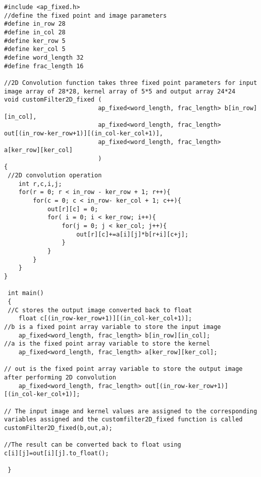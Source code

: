 
\lstset{framesep=-10pt, xleftmargin=-10pt}
\begin{lstlisting}[caption={2D Convolution for Fixed Point Variables},label={listing:5.6}]
#include <ap_fixed.h>
//define the fixed point and image parameters
#define in_row 28
#define in_col 28
#define ker_row 5
#define ker_col 5
#define word_length 32
#define frac_length 16

//2D Convolution function takes three fixed point parameters for input image array of 28*28, kernel array of 5*5 and output array 24*24
void customFilter2D_fixed (
                          ap_fixed<word_length, frac_length> b[in_row][in_col],
                          ap_fixed<word_length, frac_length> out[(in_row-ker_row+1)][(in_col-ker_col+1)],
                          ap_fixed<word_length, frac_length> a[ker_row][ker_col]
                          )
{
 //2D convolution operation
	int r,c,i,j;
	for(r = 0; r < in_row - ker_row + 1; r++){
        for(c = 0; c < in_row- ker_col + 1; c++){
            out[r][c] = 0;
            for( i = 0; i < ker_row; i++){
                for(j = 0; j < ker_col; j++){
                    out[r][c]+=a[i][j]*b[r+i][c+j];
                }
            }
        }
	}
}
 
 int main()
 {
 //C stores the output image converted back to float
 	float c[(in_row-ker_row+1)][(in_col-ker_col+1)];
//b is a fixed point array variable to store the input image 	
	ap_fixed<word_length, frac_length> b[in_row][in_col];
//a is the fixed point array variable to store the kernel	
	ap_fixed<word_length, frac_length> a[ker_row][ker_col];

// out is the fixed point array variable to store the output image after performing 2D convolution 
	ap_fixed<word_length, frac_length> out[(in_row-ker_row+1)][(in_col-ker_col+1)];

// The input image and kernel values are assigned to the corresponding variables assigned and the customfilter2D_fixed function is called 
customFilter2D_fixed(b,out,a);
	
//The result can be converted back to float using
c[i][j]=out[i][j].to_float();	
	
 }
 
\end{lstlisting}
